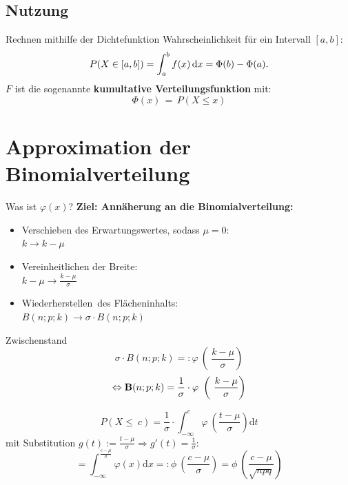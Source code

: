 \documentclass[14pt]{beamer}
\begin{document}
\subsection{Nutzung}
\begin{frame}{Rechnen mithilfe der Dichtefunktion}
Wahrscheinlichkeit für ein Intervall $[a,b]$:
$$P(X\in [a,b]) = \int_a^b f(x)\, {\rm d}x = \Phi(b)-\Phi(a).$$
$F$ ist die sogenannte \textbf{kumultative Verteilungsfunktion} mit:
$$\Phi(x) \, = \, P(X \le x)$$
\end{frame}

\section{Approximation der Binomialverteilung}
\begin{frame}{Was ist $\varphi(x)$?}
\textbf{Ziel: Annäherung an die Binomialverteilung:}
\pause
\begin{itemize}
\item Verschieben des Erwartungswertes, sodass $\mu=0$:\\
$k \to k-\mu$
\item Vereinheitlichen der Breite:\\
$k-\mu \to \frac{k-\mu}{\sigma}$
\pause
\item \glqq Wiederherstellen\grqq\ des Flächeninhalts:\\
$B(n;p;k) \to \sigma \cdot B(n;p;k)$
\end{itemize}

\end{frame}

\begin{frame}{Zwischenstand}
$$
\sigma \cdot B(n;p;k) =: \varphi\ \left(\ \frac{k-\mu}{\sigma}\right)
$$
$$
\Leftrightarrow
\begin{mathbf}
B(n;p;k) =  \frac{1}{\sigma} \cdot  \varphi\ \left(\ \frac{k-\mu}{\sigma}\right)
\end{mathbf}
$$
\end{frame}


\begin{frame}
$$
P(X\leq\ c) = \frac{1}{\sigma} \cdot \int^c_{-\infty} \varphi\ \left(\frac{t-\mu}{\sigma}\right) {\mathrm d}t
$$
mit Substitution $g(t):=\frac{t-\mu}{\sigma} \Rightarrow g'(t)=\frac{1}{\sigma}$:
$$
= \int^{\frac{c-\mu}{\sigma}}_{-\infty} \varphi(x) {\mathrm d}x =: \phi\ \left(\frac{c-\mu}{\sigma}\right) = \phi\ \left( \frac{c-\mu}{\sqrt{npq}}\right)
$$
\end{frame}
\end{document}
